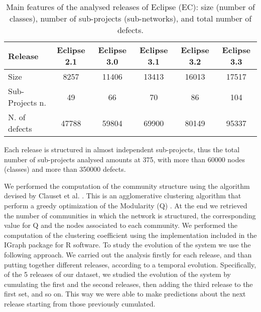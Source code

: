 \begin{table}[h]
\begin{center}
% 
% 
% 


\scalebox{0.9}
{
\begin{tabular}{|l|c|c|c|c|c|}
\hline 
Release & Eclipse 2.1 & Eclipse 3.0 & Eclipse 3.1 & Eclipse 3.2 & Eclipse 3.3 \\\hline
Size & 8257 & 11406 & 13413 & 16013 & 17517 \\
 
Sub-Projects n.& 49 & 66 & 70 & 86 & 104 \\ 

N. of defects & 47788 & 59804 & 69900 & 80149 & 95337  \\ \hline


\end{tabular}
}
\end{center}
\caption{Main features of the analysed releases of Eclipse (EC): size (number of classes), 
number of sub-projects (sub-networks), and total number of defects.}
\label{tab:Eclipse}

\end{table}

Each release is structured in almost independent sub-projects, thus the total number 
of sub-projects analysed amounts at 375, with more than 60000 nodes (classes) 
and more than 350000 defects.%

We performed the computation of the community structure using the algorithm devised by Clauset et al. \cite{Clauset:2004}. 
This is an agglomerative clustering algorithm that perform a greedy optimization of the Modularity (Q) \cite{Newman:2004}. 
At the end we retrieved the number of communities in which the network is structured, the corresponding value for Q 
and the nodes associated to each community.
We performed the computation of the clustering coefficient using the implementation included in the IGraph package 
\cite{igraph} for R software\cite{R}. 
To study the evolution of the system we use the following approach. We carried out the 
analysis firstly for each release, and than putting together different releases, according to a temporal evolution. 
Specifically, of the 5 releases of our dataset, we
studied the evolution of the system by cumulating the first and the second releases, then adding the third release 
to the first set, and so on. 
This way we were able to make predictions about the next release starting from those previously cumulated.